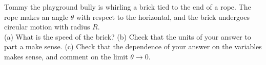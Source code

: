 Tommy the playground bully is whirling a brick tied to the end
of a rope. The rope makes an angle $\theta$ with respect to the
horizontal, and the brick undergoes circular motion with radius $R$.\\
%
(a) What is the speed of the brick?\answercheck\hwendpart
%
(b) Check that the units of your answer to part a make sense.\hwendpart
%
(c) Check that the dependence of your answer on the variables makes sense, and comment
on the limit $\theta\rightarrow0$.\hwendpart

